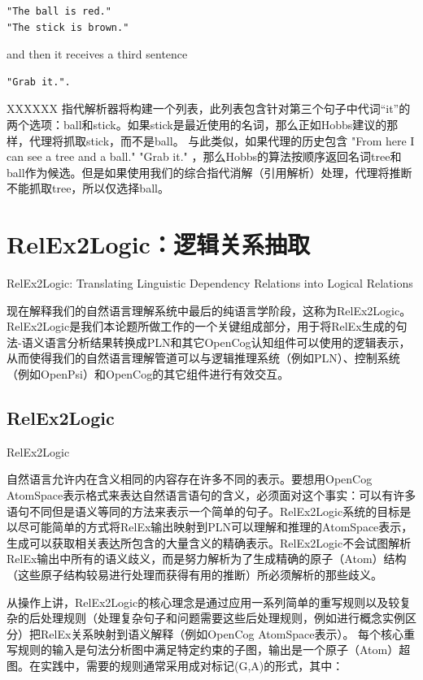 \begin{verbatim}
"The ball is red."
"The stick is brown."
\end{verbatim}

\noindent and then it receives a third sentence

\begin{verbatim}
"Grab it.".
\end{verbatim}


XXXXXX
指代解析器将构建一个列表，此列表包含针对第三个句子中代词“it”的两个选项：ball和stick。如果stick是最近使用的名词，那么正如Hobbs建议的那样，代理将抓取stick，而不是ball。
与此类似，如果代理的历史包含
"From here I can see a tree and a ball."
"Grab it."
，那么Hobbs的算法按顺序返回名词tree和ball作为候选。但是如果使用我们的综合指代消解（引用解析）处理，代理将推断不能抓取tree，所以仅选择ball。


\section{RelEx2Logic：逻辑关系抽取}{RelEx2Logic: Translating Linguistic Dependency Relations into Logical Relations}

现在解释我们的自然语言理解系统中最后的纯语言学阶段，这称为RelEx2Logic。RelEx2Logic是我们本论题所做工作的一个关键组成部分，用于将RelEx生成的句法-语义语言分析结果转换成PLN和其它OpenCog认知组件可以使用的逻辑表示，从而使得我们的自然语言理解管道可以与逻辑推理系统（例如PLN）、控制系统（例如OpenPsi）和OpenCog的其它组件进行有效交互。

\subsection{RelEx2Logic}{RelEx2Logic}

自然语言允许内在含义相同的内容存在许多不同的表示。要想用OpenCog AtomSpace表示格式来表达自然语言语句的含义，必须面对这个事实：可以有许多语句不同但是语义等同的方法来表示一个简单的句子。RelEx2Logic系统的目标是以尽可能简单的方式将RelEx输出映射到PLN可以理解和推理的AtomSpace表示，生成可以获取相关表达所包含的大量含义的精确表示。RelEx2Logic不会试图解析RelEx输出中所有的语义歧义，而是努力解析为了生成精确的原子（Atom）结构（这些原子结构较易进行处理而获得有用的推断）所必须解析的那些歧义。

从操作上讲，RelEx2Logic的核心理念是通过应用一系列简单的重写规则以及较复杂的后处理规则（处理复杂句子和问题需要这些后处理规则，例如进行概念实例区分）把RelEx关系映射到语义解释（例如OpenCog AtomSpace表示）。
每个核心重写规则的输入是句法分析图中满足特定约束的子图，输出是一个原子（Atom）超图。在实践中，需要的规则通常采用成对标记(G,A)的形式，其中：

